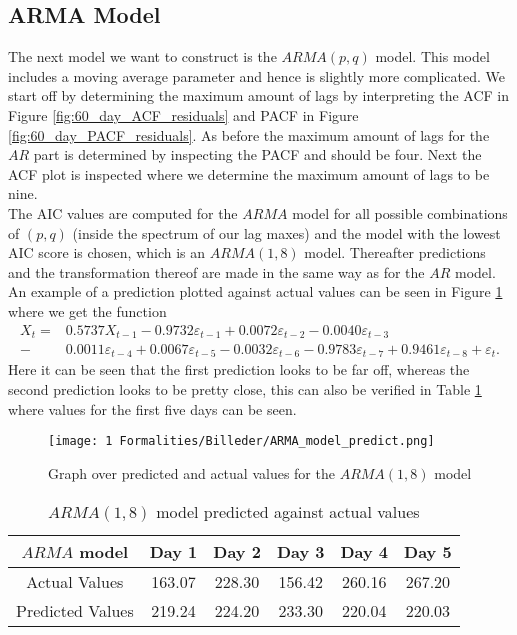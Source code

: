 \subsection{ARMA Model}
The next model we want to construct is the $ARMA(p,q)$ model. This model includes a moving average parameter and hence is slightly more complicated. We start off by determining the maximum amount of lags by interpreting the ACF in Figure \ref{fig:60_day_ACF_residuals} and PACF in Figure \ref{fig:60_day_PACF_residuals}. As before the maximum amount of lags for the $AR$ part is determined by inspecting the PACF and should be four. Next the ACF plot is inspected where we determine the maximum amount of lags to be nine.\\
\noindent The AIC values are computed for the $ARMA$ model for all possible combinations of $(p,q)$ (inside the spectrum of our lag maxes) and the model with the lowest AIC score is chosen, which is an $ARMA(1,8)$ model. Thereafter predictions and the transformation thereof are made in the same way as for the $AR$ model. An example of a prediction plotted against actual values can be seen in Figure \ref{fig:ARMA_model_with_predictions} where we get the function
\begin{align*}
     X_t=&0.5737X_{t-1}-0.9732\varepsilon_{t-1}+0.0072\varepsilon_{t-2}-0.0040 \varepsilon_{t-3}\\
     -&0.0011\varepsilon_{t-4}+0.0067\varepsilon_{t-5}-0.0032\varepsilon_{t-6}-0.9783\varepsilon_{t-7}+0.9461\varepsilon_{t-8}+\varepsilon_t.
\end{align*}
Here it can be seen that the first prediction looks to be far off, whereas the second prediction looks to be pretty close, this can also be verified in Table \ref{tab:ARMA_two_rows} where values for the first five days can be seen. 
\begin{figure}[H]
    \centering
    \texttt{[image: 1 Formalities/Billeder/ARMA\_model\_predict.png]}
    \caption{Graph over predicted and actual values for the $ARMA(1,8)$ model}
    \label{fig:ARMA_model_with_predictions}
\end{figure}

\begin{table}[H]
  \centering
  \begin{tabular}{|c|c|c|c|c|c|}
    \hline
    $ARMA$ model & Day 1 & Day 2 & Day 3 & Day 4 & Day 5 \\
    \hline
    Actual Values & 163.07 & 228.30 & 156.42 & 260.16 & 267.20 \\
    \hline
    Predicted Values &  219.24 & 224.20 & 233.30 & 220.04 & 220.03 \\
    \hline
  \end{tabular}
  \caption{$ARMA(1,8)$ model predicted against actual values}
  \label{tab:ARMA_two_rows}
\end{table}


